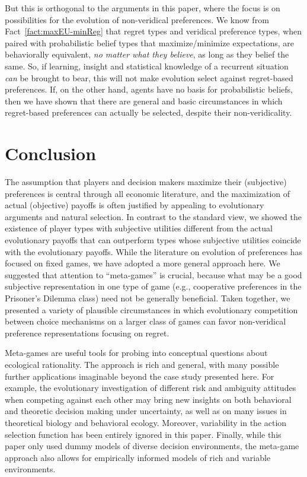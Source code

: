 \documentclass[fleqn,reqno,11pt]{article}
\begin{document}
But this is orthogonal to the arguments in this paper, where the focus is on possibilities for
the evolution of non-veridical preferences. We know from Fact~\ref{fact:maxEU-minReg} that
regret types and veridical preference types, when paired with probabilistic belief types that
maximize/minimize expectations, are behaviorally equivalent, \emph{no matter what they believe},
as long as they belief the same. So, if learning, insight and statistical knowledge of a
recurrent situation \emph{can} be brought to bear, this will not make evolution select against
regret-based preferences. If, on the other hand, agents have no basis for probabilistic
beliefs, then we have shown that there are general and basic circumstances in which
regret-based preferences can actually be selected, despite their non-veridicality.
\fi


\section{Conclusion} \label{sec:conclusion}


The assumption that players and decision makers maximize their (subjective) preferences is central through all economic literature, and the maximization of actual (objective) payoffs is often justified by appealing to evolutionary arguments and natural
selection. In contrast to the standard view, we showed the
existence of player types with subjective utilities different
from the actual evolutionary payoffs that can outperform types whose
subjective utilities coincide with the evolutionary payoffs.
While the literature on evolution of preferences has focused
on fixed games, we have adopted a
more general approach here. We suggested that attention
to “meta-games” is crucial, because what may be a good
subjective representation in one type of game (e.g., cooperative preferences in the Prisoner’s Dilemma class) need not
be generally beneficial. Taken together, we presented a variety of plausible circumstances in which evolutionary competition between choice
mechanisms on a larger class of games can favor non-veridical preference representations focusing on regret.

Meta-games are useful tools for probing into conceptual questions about ecological
rationality. The approach is rich and general, with many possible further
applications imaginable beyond the case study presented here. For example, the evolutionary
investigation of different risk and ambiguity attitudes when competing against each other may bring new insights on both behavioral and theoretic
decision making under uncertainty, as well as on many issues in theoretical biology and
behavioral ecology. Moreover, variability in the action selection function has been entirely
ignored in this paper. Finally, while this paper only used dummy models of diverse decision
environments, the meta-game approach also allows for empirically informed models of rich and
variable environments.
\end{document}
